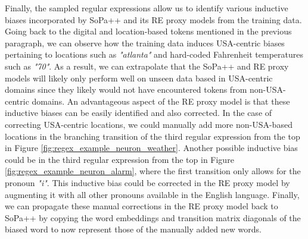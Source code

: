 Finally, the sampled regular expressions allow us to identify various inductive
biases incorporated by SoPa++ and its RE proxy models from the training data.
Going back to the digital and location-based tokens mentioned in the previous
paragraph, we can observe how the training data induces USA-centric biases
pertaining to locations such as \textit{"atlanta"} and hard-coded Fahrenheit
temperatures such as \textit{"70"}. As a result, we can extrapolate that the
SoPa++ and RE proxy models will likely only perform well on unseen data based in
USA-centric domains since they likely would not have encountered tokens from
non-USA-centric domains. An advantageous aspect of the RE proxy model is that
these inductive biases can be easily identified and also corrected. In the case
of correcting USA-centric locations, we could manually add more non-USA-based
locations in the branching transition of the third regular expression from the
top in Figure \ref{fig:regex_example_neuron_weather}. Another possible inductive
bias could be in the third regular expression from the top in Figure
\ref{fig:regex_example_neuron_alarm}, where the first transition only allows for
the pronoun \textit{"i"}. This inductive bias could be corrected in the RE proxy
model by augmenting it with all other pronouns available in the English
language. Finally, we can propagate these manual corrections in the RE proxy
model back to SoPa++ by copying the word embeddings and transition matrix
diagonals of the biased word to now represent those of the manually added new
words.

